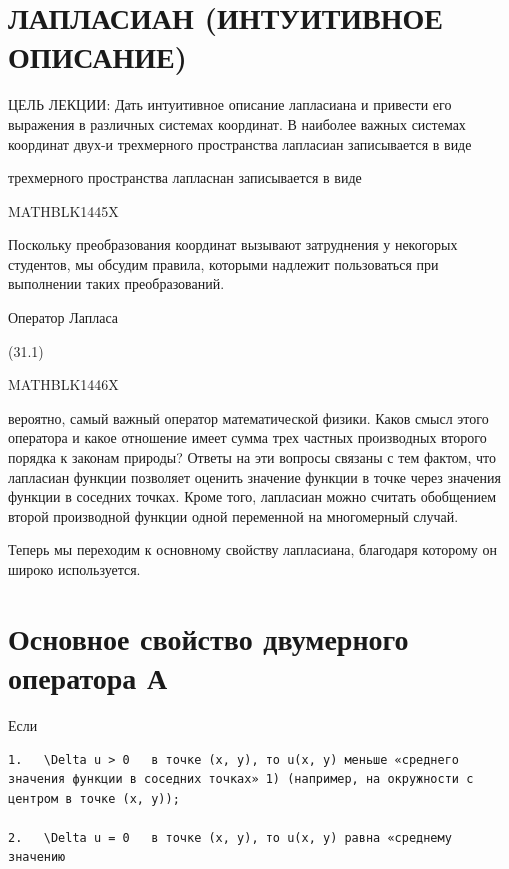 \documentclass[
]{article}
\begin{document}
\section{ЛАПЛАСИАН (ИНТУИТИВНОЕ
ОПИСАНИЕ)}\label{ux43bux430ux43fux43bux430ux441ux438ux430ux43d-ux438ux43dux442ux443ux438ux442ux438ux432ux43dux43eux435-ux43eux43fux438ux441ux430ux43dux438ux435}

ЦЕЛЬ ЛЕКЦИИ: Дать интуитивное описание лапласиана и привести его
выражения в различных системах координат. В наиболее важных системах
координат двух-и трехмерного пространства лапласиан записывается в виде

трехмерного пространства лапласнан записывается в виде

MATHBLK1445X

Поскольку преобразования координат вызывают затруднения у некогорых
студентов, мы обсудим правила, которыми надлежит пользоваться при
выполнении таких преобразований.

Оператор Лапласа

(31.1)

MATHBLK1446X

вероятно, самый важный оператор математической физики. Каков смысл этого
оператора и какое отношение имеет сумма трех частных производных второго
порядка к законам природы? Ответы на эти вопросы связаны с тем фактом,
что лапласиан функции позволяет оценить значение функции в точке через
значения функции в соседних точках. Кроме того, лапласиан можно считать
обобщением второй производной функции одной переменной на многомерный
случай.

Теперь мы переходим к основному свойству лапласиана, благодаря которому
он широко используется.

\section{Основное свойство двумерного оператора
А}\label{ux43eux441ux43dux43eux432ux43dux43eux435-ux441ux432ux43eux439ux441ux442ux432ux43e-ux434ux432ux443ux43cux435ux440ux43dux43eux433ux43e-ux43eux43fux435ux440ux430ux442ux43eux440ux430-ux430}

Если

\begin{verbatim}
1.   \Delta u > 0   в точке (x, y), то u(x, y) меньше «среднего значения функции в соседних точках» 1) (например, на окружности с центром в точке (x, y));

2.   \Delta u = 0   в точке (x, y), то u(x, y) равна «среднему значению
\end{verbatim}
\end{document}
